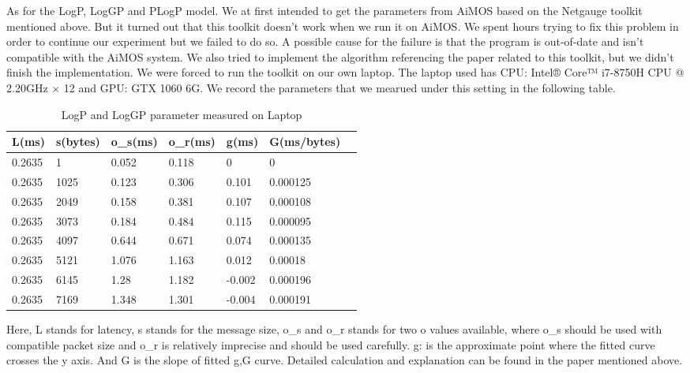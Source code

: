 As for the LogP, LogGP and PLogP model. We at first intended to get the parameters from AiMOS based on the Netgauge toolkit\cite{hoefler2007netgauge} mentioned above. But it turned out that this toolkit doesn't work when we run it on AiMOS. We spent hours trying to fix this problem in order to continue our experiment but we failed to do so. A possible cause for the failure is that the program is out-of-date and isn't compatible with the AiMOS system. We also tried to implement the algorithm referencing the paper related to this toolkit\cite{hoefler2007low}, but we didn't finish the implementation. We were forced to run the toolkit on our own laptop. The laptop used has CPU: Intel® Core™ i7-8750H CPU @ 2.20GHz × 12  and GPU: GTX 1060 6G. We record the parameters that we mearued under this setting in the following table. 

\begin{table}[H]
\begin{tabular}{lllllll}
L(ms)  & s(bytes) & o\_s(ms) & o\_r(ms) & g(ms)  & G(ms/bytes) \\ \hline
0.2635 & 1        & 0.052    & 0.118    & 0      & 0           \\
0.2635 & 1025     & 0.123    & 0.306    & 0.101  & 0.000125    \\
0.2635 & 2049     & 0.158    & 0.381    & 0.107  & 0.000108    \\
0.2635 & 3073     & 0.184    & 0.484    & 0.115  & 0.000095    \\
0.2635 & 4097     & 0.644    & 0.671    & 0.074  & 0.000135    \\
0.2635 & 5121     & 1.076    & 1.163    & 0.012  & 0.00018     \\
0.2635 & 6145     & 1.28     & 1.182    & -0.002 & 0.000196    \\
0.2635 & 7169     & 1.348    & 1.301    & -0.004 & 0.000191   
\end{tabular}
\caption{LogP and LogGP parameter measured on Laptop}
\label{tab:my-table}
\end{table}

Here, L stands for latency, s stands for the message size, o\_s and o\_r stands for two o values available, where o\_s should be used with compatible packet size and o\_r is relatively imprecise and should be used carefully. g: is the approximate point where the fitted curve crosses the y axis. And G is the slope of fitted g,G curve. Detailed calculation and explanation can be found in the paper\cite{hoefler2007low} mentioned above.
